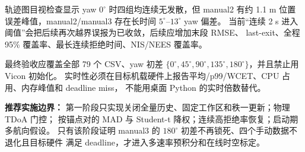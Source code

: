 \documentclass[11pt,a4paper]{ctexart}
\begin{document}
轨迹图目视检查显示 yaw $0^\circ$ 时四组均连续无发散，但 manual2 有约 1.1 m
位置误差峰值，manual2/manual3 存在长时间 $5^\circ$--$13^\circ$ yaw 偏差。
当前“连续 2 s 进入阈值”会把后续再次越界误报为已收敛，后续应增加末段 RMSE、
last-exit、全程 95\% 覆盖率、最长连续拒绝时间、NIS/NEES 覆盖率。

最终验收应覆盖全部 79 个 CSV、yaw 初差
$\{0^\circ,45^\circ,90^\circ,135^\circ,180^\circ\}$，并且禁止用 Vicon 初始化。
实时性必须在目标机载硬件上报告平均/p99/WCET、CPU 占用、内存峰值和 deadline miss，
不能用桌面 Python 的实时倍数替代。

\noindent\textbf{推荐实施边界：}
第一阶段只实现关闭全量历史、固定工作区和秩一更新；物理 TDoA 门控；
按锚点对的 MAD 与 Student-t 降权；连续高拒绝率恢复；启动期多航向假设。
只有该阶段证明 manual3 的 $180^\circ$ 初差不再锁死、四个手动数据不退化且目标硬件
满足 deadline，才进入多速率预积分和在线时空标定。
\end{document}

